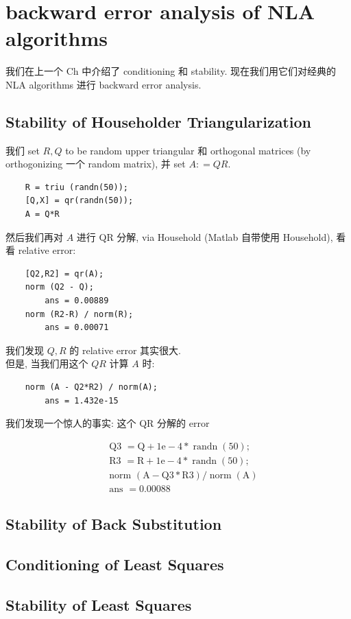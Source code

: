 \chapter{backward error analysis of NLA algorithms\cite{doi:10.1137/1.9780898719574.ch3}}
我们在上一个 Ch 中介绍了 conditioning 和 stability. 现在我们用它们对经典的 NLA algorithms 进行 backward error analysis.


\section{Stability of Householder Triangularization}
我们 set $R, Q$ to be random upper triangular 和 orthogonal matrices (by orthogonizing 一个 random matrix), 并 set $A : = QR$.
\begin{verbatim}
    R = triu (randn(50));
    [Q,X] = qr(randn(50));
    A = Q*R
\end{verbatim}
然后我们再对 $A$ 进行 QR 分解, via Household (Matlab 自带使用 Household), 看看 relative error: 
\begin{verbatim}
    [Q2,R2] = qr(A);
    norm (Q2 - Q);
        ans = 0.00889
    norm (R2-R) / norm(R);
        ans = 0.00071
\end{verbatim}
我们发现 $Q,R$ 的 relative error 其实很大.\\
但是, 当我们用这个 $QR$ 计算 $A$ 时:
\begin{verbatim}
    norm (A - Q2*R2) / norm(A);
        ans = 1.432e-15
\end{verbatim}
我们发现一个惊人的事实: 这个 QR 分解的 error 


$$
\begin{aligned}
& \text { Q3 }=\mathrm{Q}+1 \mathrm{e}-4 * \operatorname{randn}(50) ; \\
& \text { R3 }=\mathrm{R}+1 \mathrm{e}-4 * \operatorname{randn}(50) ; \\
& \text { norm }(\mathrm{A}-\mathrm{Q} 3 * \mathrm{R} 3) / \operatorname{norm}(\mathrm{A}) \\
& \text { ans }=0.00088
\end{aligned}
$$







\section{Stability of Back Substitution}








\section{Conditioning of Least Squares}







\section{Stability of Least Squares}




















